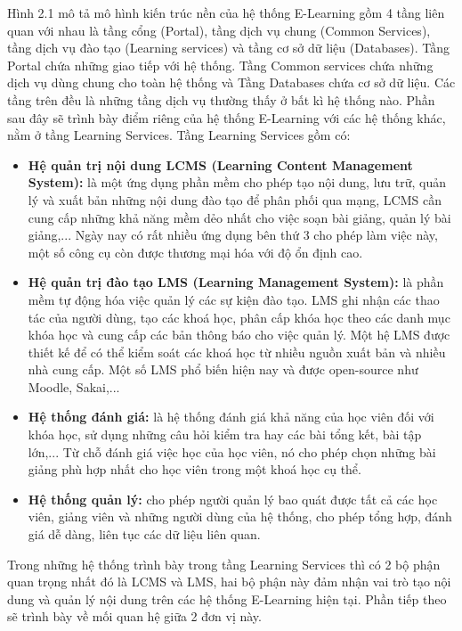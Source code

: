 	Hình 2.1 mô tả mô hình kiến trúc nền của hệ thống E-Learning gồm 4 tầng liên quan với nhau là tầng cổng (Portal), tầng dịch vụ chung (Common Services), tầng dịch vụ đào tạo (Learning services) và tầng cơ sở dữ liệu (Databases). Tầng Portal chứa những giao tiếp với hệ thống. Tầng Common services chứa những dịch vụ dùng chung cho toàn hệ thống và Tầng Databases chứa cơ sở dữ liệu. Các tầng trên đều là những tầng dịch vụ thường thấy ở bất kì hệ thống nào. Phần sau đây sẽ trình bày điểm riêng của hệ thống E-Learning với các hệ thống khác, nằm ở tầng Learning Services. Tầng Learning Services gồm có:
	\begin{itemize}
		
		\item \textbf{Hệ quản trị nội dung LCMS (Learning Content Management System):} là một ứng dụng phần mềm cho phép tạo nội dung, lưu trữ, quản lý và xuất bản những nội dung đào tạo để phân phối qua mạng, LCMS cần cung cấp những khả năng mềm dẻo nhất cho việc soạn bài giảng, quản lý bài giảng,... Ngày nay có rất nhiều ứng dụng bên thứ 3 cho phép làm việc này, một số công cụ còn được thương mại hóa với độ ổn định cao.
	
		\item \textbf{Hệ quản trị đào tạo LMS (Learning Management System):} là phần mềm tự động hóa việc quản lý các sự kiện đào tạo. LMS ghi nhận các thao tác của người dùng, tạo các khoá học, phân cấp khóa học theo các danh mục khóa học và cung cấp các bản thông báo cho việc quản lý. Một hệ LMS được thiết kế để có thể kiểm soát các khoá học từ nhiều nguồn xuất bản và nhiều nhà cung cấp. Một số LMS phổ biến hiện nay và được open-source như Moodle, Sakai,...
	
		\item \textbf{Hệ thống đánh giá:} là hệ thống đánh giá khả năng của học viên đối với khóa học, sử dụng những câu hỏi kiểm tra hay các bài tổng kết, bài tập lớn,... Từ chỗ đánh giá việc học của học viên, nó cho phép chọn những bài giảng phù hợp nhất cho học viên trong một khoá học cụ thể.
	
		\item \textbf{Hệ thống quản lý:} cho phép người quản lý bao quát được tất cả các học viên, giảng viên và những người dùng của hệ thống, cho phép tổng hợp, đánh giá dễ dàng, liên tục các dữ liệu liên quan. 	
		
	\end{itemize}

	Trong những hệ thống trình bày trong tầng Learning Services thì có 2 bộ phận quan trọng nhất đó là LCMS và LMS, hai bộ phận này đảm nhận vai trò tạo nội dung và quản lý nội dung trên các hệ thống E-Learning hiện tại. Phần tiếp theo sẽ trình bày về mối quan hệ giữa 2 đơn vị này.\\

